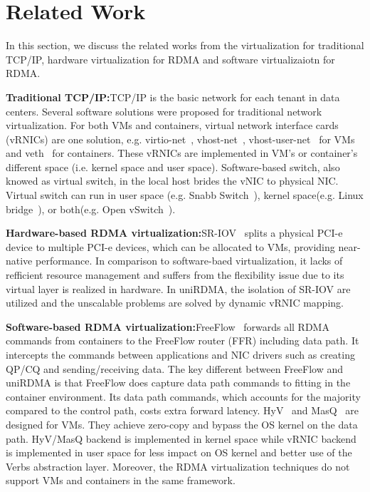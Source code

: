 \section{Related Work} \label{relatedwork}

In this section, we discuss the related works from the virtualization for traditional TCP/IP, hardware virtualization for RDMA and software virtualizaiotn for RDMA.

\textbf{Traditional TCP/IP:}\quad TCP/IP is the basic network for each tenant in data centers. Several software solutions were proposed for traditional network virtualization. For both VMs and containers, virtual network interface cards (vRNICs) are one solution, e.g. virtio-net~\cite{virtio-russell2008}, vhost-net~\cite{vhost-net},  vhost-user-net~\cite{vhost-user-net} for VMs and veth~\cite{veth} for containers. These vRNICs are implemented in VM's or container's different space (i.e. kernel space and user space). Software-based switch, also knowed as virtual switch, in the local host brides the vNIC to physical NIC. Virtual switch can run in user space (e.g. Snabb Switch~\cite{snabb}), kernel space(e.g. Linux bridge~\cite{linux-bridge}), or both(e.g. Open vSwitch~\cite{ovs-2015}). 

\textbf{Hardware-based RDMA virtualization:}\quad SR-IOV~\cite{sr-iov} splits a physical PCI-e device to multiple PCI-e devices, which can be allocated to VMs, providing near-native performance. In comparison to software-baed virtualization, it lacks of refficient resource management and suffers from the flexibility issue due to its virtual layer is realized in hardware. In uniRDMA, the isolation of SR-IOV are utilized and the unscalable problems are solved by dynamic vRNIC mapping. 

\textbf{Software-based RDMA virtualization:}\qquad FreeFlow~\cite{kim2019freeflow} forwards all RDMA commands from containers to the FreeFlow router (FFR) including data path. It intercepts the commands between applications and NIC drivers such as creating QP/CQ and sending/receiving data. The key different between FreeFlow and uniRDMA is that FreeFlow does capture data path commands to fitting in the container environment. Its data path commands, which accounts for the majority compared to the control path, costs extra forward latency. HyV~\cite{pfefferle2015hybrid} and MasQ~\cite{he2020masq} are designed for VMs. They achieve zero-copy and bypass the OS kernel on the data path. HyV/MasQ backend is implemented in kernel space while \sys vRNIC backend is implemented in user space for less impact on OS kernel and better use of the Verbs abstraction layer. Moreover, the RDMA virtualization techniques do not support VMs and containers in the same framework.
